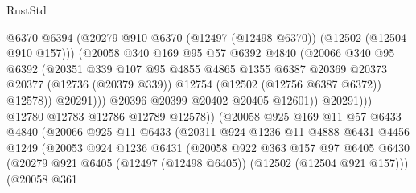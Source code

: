 \begin{lexlean}{RustStd}
\begin{coremodule}
                              @6370
                              @6394
                              (@20279
                                @910
                                @6370
                                (@12497 (@12498 @6370))
                                (@12502 (@12504 @910 @157)))
                              (@20058
                                @340
                                @169
                                @95
                                @57
                                @6392
                                @4840
                                (@20066
                                  @340
                                  @95
                                  @6392
                                  (@20351
                                    @339
                                    @107
                                    @95
                                    @4855
                                    @4865
                                    @1355
                                    @6387
                                    @20369
                                    @20373
                                    @20377
                                    (@12736 (@20379 @339))
                                    @12754
                                    (@12502 (@12756 @6387 @6372))
                                    @12578))
                                @20291)))
                          @20396
                          @20399
                          @20402
                          @20405
                          @12601))
                      @20291)))
                @12780
                @12783
                @12786
                @12789
                @12578))
            (@20058
              @925
              @169
              @11
              @57
              @6433
              @4840
              (@20066
                @925
                @11
                @6433
                (@20311
                  @924
                  @1236
                  @11
                  @4888
                  @6431
                  @4456
                  @1249
                  (@20053
                    @924
                    @1236
                    @6431
                    (@20058
                      @922
                      @363
                      @157
                      @97
                      @6405
                      @6430
                      (@20279 @921 @6405 (@12497 (@12498 @6405)) (@12502 (@12504 @921 @157)))
                      (@20058
                        @361

\end{coremodule}
\end{lexlean}
